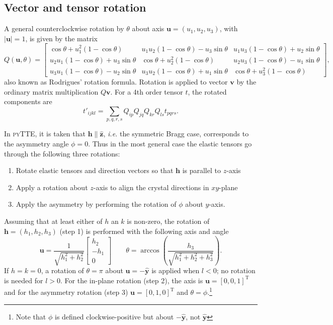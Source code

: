 \documentclass[11pt,a4paper]{article}
\begin{document}
\subsection{Vector and tensor rotation}
A general counterclockwise rotation by $\theta$ about axis $\mathbf{u} = (u_1, u_2, u_3)$, with $|\mathbf{u}| = 1$, is given by the matrix
\begin{equation}
Q(\mathbf{u},\theta) = \left[\begin{matrix}
\cos \theta + u_1^2 (1 - \cos \theta) & u_1 u_2 (1 -\cos \theta) - u_3 \sin \theta &  u_1 u_3 (1 -\cos \theta) + u_2 \sin \theta \\
u_2 u_1 (1 -\cos \theta) + u_3 \sin \theta & \cos \theta + u_2^2 (1 - \cos \theta) & u_2 u_3 (1 -\cos \theta) - u_1 \sin \theta \\
u_3 u_1 (1 -\cos \theta) - u_2 \sin \theta &  u_3 u_2 (1 -\cos \theta) + u_1 \sin \theta & \cos \theta + u_3^2 (1 - \cos \theta)
\end{matrix} \right],
\end{equation}
also known as Rodrigues' rotation formula. Rotation is applied to vector $\mathbf{v}$ by the ordinary matrix multiplication $Q\mathbf{v}$. For a 4th order tensor $t$, the rotated components are 
\begin{equation}
t'_{ijkl} = \sum_{p,q,r,s} Q_{ip}Q_{jq}Q_{kr}Q_{ls} t_{pqrs}.
\end{equation}

In \textsc{pyTTE}, it is taken that $\mathbf{h} \parallel \hat{\mathbf{z}}$, \emph{i.e.} the symmetric Bragg case, corresponds to the asymmetry angle $\phi=0$. Thus in the most general case the elastic tensors go through the following three rotations:
\begin{enumerate}
\item Rotate elastic tensors and direction vectors so that $\mathbf{h}$ is parallel to $z$-axis
\item Apply a rotation about $z$-axis to align the crystal directions in $xy$-plane
\item Apply the asymmetry by performing the rotation of $\phi$ about $y$-axis.
\end{enumerate}
Assuming that at least either of $h$ an $k$ is non-zero, the rotation of $\mathbf{h}= (h_1,h_2,h_3)$ (step 1) is performed with the following axis and angle
\begin{equation}
\mathbf{u} = \frac{1}{\sqrt{h_1^2 + h_2^2}} \left[\begin{matrix} h_2 \\ -h_1 \\ 0 \end{matrix}\right] \qquad
\theta = \arccos \left( \frac{h_3}{\sqrt{h_1^2 + h_2^2 + h_3^2}} \right).
\end{equation}
If $h=k=0$, a rotation of $\theta = \pi$ about $\mathbf{u} = -\hat{\mathbf{y}}$ is applied when $l<0$; no rotation is needed for $l>0$. For the in-plane rotation (step 2), the axis is $\mathbf{u} = [0,0,1]^{\mathrm{T}}$ and for the asymmetry rotation (step 3) $\mathbf{u} = [0,1,0]^{\mathrm{T}}$ and $\theta = \phi$.\footnote{Note that $\phi$ is defined clockwise-positive but about $-\hat{\mathbf{y}}$, not $\hat{\mathbf{y}}$}
\end{document}
